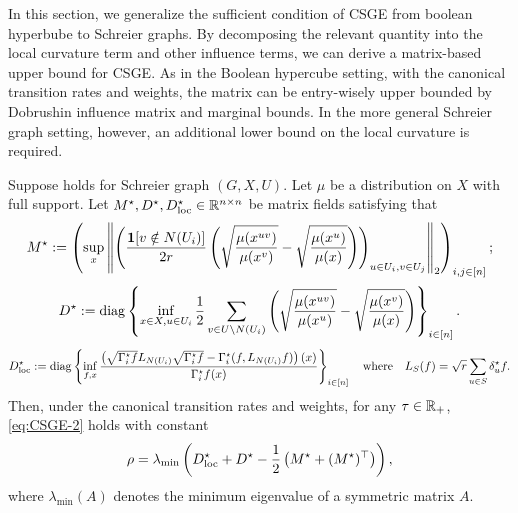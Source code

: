 In this section, we generalize the sufficient condition of CSGE from boolean hyperbube to Schreier graphs.
By decomposing the relevant quantity into the local curvature term and other influence terms, we can derive a matrix-based upper bound for CSGE.
As in the Boolean hypercube setting, with the canonical transition rates and weights, the matrix can be entry-wisely upper bounded by Dobrushin influence matrix and marginal bounds.
In the more general Schreier graph setting, however, an additional lower bound on the local curvature is required.
\begin{theorem}\label{thm:SGraph_CSGE_general}
Suppose  holds for Schreier graph $(G,X,U)$.
Let $\mu$ be a distribution on $X$ with full support. 
Let $M^\star,D^\star,D^\star_{\-{loc}}\in \R^{n \times n}$ be matrix fields satisfying that
\begin{equation}\label{eq:def_M_star_Sgraph}
    M^\star := \tp{\sup_x\norm{\tp{\frac{\ind[v\notin N(U_i)]}{2r}\tp{\sqrt{\frac{\mu(x^{uv})}{\mu(x^v)}}-\sqrt{\frac{\mu(x^u)}{\mu(x)}}}}_{u\in U_i, v\in U_j}}_2}_{i,j\in[n]};
\end{equation}
\begin{equation}\label{eq:def_D_star_Sgraph}
    D^\star := \diag\left\{\inf_{x\in X,u\in U_i} \frac {1}{2}\sum_{v\in U\setminus N(U_i)} \tp{\sqrt{\frac{\mu(x^{uv})}{\mu(x^u)}} - \sqrt{\frac{\mu(x^v)}{\mu(x)}}}\right\}_{i\in[n]}.
\end{equation}
\begin{equation}\label{eq:def_D_star_loc_Sgraph}
    D^\star_{\-{loc}} := \diag\left\{\inf_{f,x} \frac{\tp{\sqrt{\Gamma_i^\star f}L_{N(U_i)}\sqrt{\Gamma_i^\star f} - \Gamma_i^\star(f,L_{N(U_i)}f)}(x)}{\Gamma_{i}^\star f (x)} \right\}_{i\in[n]} \quad\text{where}\quad L_S(f) = \sqrt r\sum_{u\in S} \delta_u^\star f.
\end{equation}
Then, under the canonical transition rates and weights, for any $\tau \in \R_+$, \ref{eq:CSGE-2} holds with constant
\begin{align*}
    \rho =
    \lambda_{\min}\left( D_{\-{loc}}^\star + D^\star - \frac{1}{2}\left( M^\star + (M^\star)^\top \right) \right),
\end{align*}
where $\lambda_{\min}(A)$ denotes the minimum eigenvalue of a symmetric matrix $A$.
\end{theorem}

